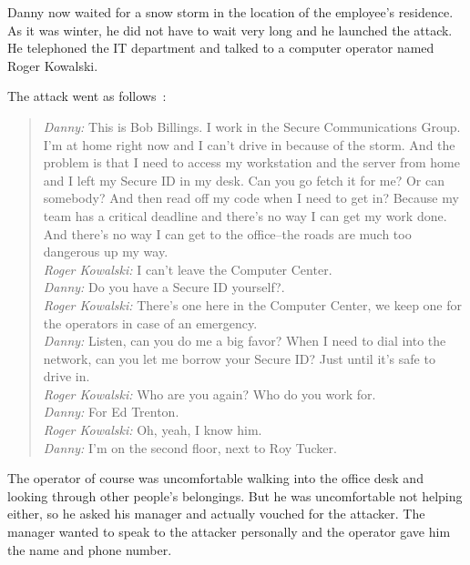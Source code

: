 Danny now waited for a snow storm in the location of the employee's residence.
As it was winter, he did not have to wait very long and he launched the attack.
He telephoned the IT department and talked to a computer operator named Roger
Kowalski.

The attack went as follows~\cite[p. 86]{mitnick2003}:

\begin{quote}
\textit{Danny:} \glqq{}This is Bob Billings. I work in the Secure Communications Group. I'm at
home right now and I can't drive in because of the storm. And the problem is
that I need to access my workstation and the server from home and I left my
Secure ID in my desk. Can you go fetch it for me? Or can somebody? And then
read off my code when I need to get in? Because my team has a critical deadline
and there's no way I can get my work done. And there's no way I can get to the
office--the roads are much too dangerous up my way.\grqq{}\\
\textit{Roger Kowalski:} \glqq{}I can't leave the Computer Center.\grqq{}\\
\textit{Danny:} \glqq{}Do you have a Secure ID yourself?.\grqq{}\\
\textit{Roger Kowalski:} \glqq{}There's one here in the Computer Center, we keep one
for the operators in case of an emergency.\grqq{}\\
\textit{Danny:} \glqq{}Listen, can you do me a big favor? When I need to dial into
the network, can you let me borrow your Secure ID? Just until it's safe to
drive in.\grqq{}\\
\textit{Roger Kowalski:} \glqq{}Who are you again? Who do you work for.\grqq{}\\
\textit{Danny:} \glqq{}For Ed Trenton.\grqq{}\\
\textit{Roger Kowalski:} \glqq{}Oh, yeah, I know him.\grqq{}\\
\textit{Danny:} \glqq{}I'm on the second floor, next to Roy Tucker.\grqq{}\\

\end{quote}

The operator of course was uncomfortable walking into the office desk and
looking through other people's belongings. But he was uncomfortable not helping either,
so he asked his manager and actually vouched for the attacker. The manager
wanted to speak to the attacker personally and the operator gave him the name
and phone number.

